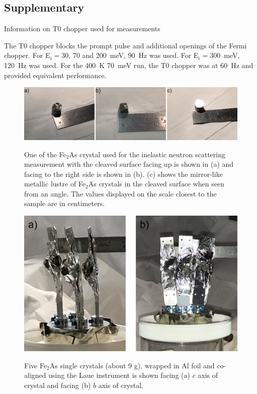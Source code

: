 \documentclass[letterpaper,10pt,doublespacing,edeposit]{uiucthesis2020}
\begin{document}
\begin{mainmatter}
\section{Supplementary}

Information on T0 chopper used for measurements

The T0 chopper blocks the prompt pulse and additional openings of the Fermi chopper.  For E$_i = 30$, 70 and 200~meV, 90~Hz was used. For E$_i = 300$~meV, 120~Hz was used.
For the 400~K 70~meV run, the T0 chopper was at 60~Hz and provided equivalent performance.

\vspace{2em}

\begin{figure}[h]
\centering\includegraphics[width=\columnwidth]{figures/ch8/crystal.png} \\
\caption{\label{fig:crystal_array}
One of the Fe$_2$As crystal used for the inelastic neutron scattering measurement with the cleaved surface facing up is shown in (a) and facing to the right side is shown in (b). (c) shows the mirror-like metallic lustre of Fe$_2$As crystals in the cleaved surface when seen from an angle. The values displayed on the scale closest to the sample are in centimeters.
} 
\end{figure}

\begin{figure}[h]
\centering\includegraphics[width=0.5\columnwidth]{figures/ch8/crystal_array.png} \\
\caption{\label{fig:crystal_array}
Five Fe$_2$As single crystals (about 9 g), wrapped in Al foil and co-aligned using the Laue instrument is shown facing (a) $c$ axis of crystal and facing (b) $b$ axis of crystal.
} 
\end{figure}


\end{mainmatter}
\end{document}
